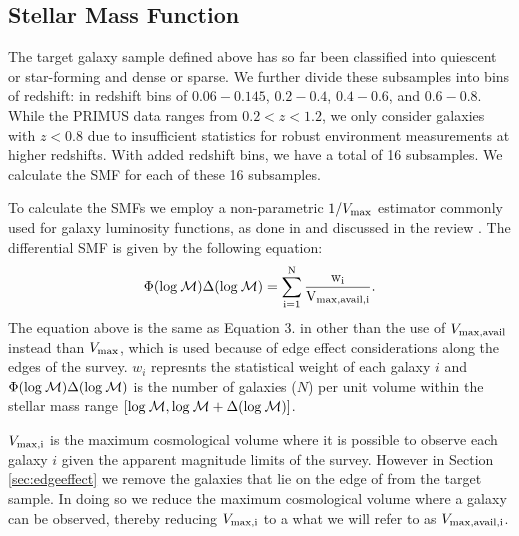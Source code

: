 \documentclass{emulateapj}
\begin{document}
\subsection{Stellar Mass Function} \label{sec:smf_const}
The target galaxy sample defined above has so far
been classified into quiescent or star-forming and 
dense or sparse. We further divide these subsamples 
into bins of redshift:  in redshift bins of $0.06-0.145$, 
$0.2-0.4$, $0.4-0.6$, and $0.6-0.8$. While the 
PRIMUS data ranges from $0.2 < z < 1.2$, we only 
consider galaxies with $ z<0.8$ due to insufficient
statistics for robust environment measurements at 
higher redshifts. With added redshift bins, we have a
total of 16 subsamples. We calculate the SMF for 
each of these 16 subsamples. 

To calculate the SMFs we employ a non-parametric $1/{V_{\rm{max}}}$ estimator commonly used for galaxy luminosity functions, as done in \cite{Moustakas:2013aa} and discussed 
in the review \cite{Johnston:2011aa}. 
The differential SMF is given by the following equation:
\begin{equation} \label{eq:phi}
\Phi(\rm{log}\: \mathcal{M}) \Delta(\rm{log} \:\mathcal{M}) = \sum\limits_{i=1}^{N} \frac{w_i}{V_{\rm{max,avail},i}}. 
\end{equation}
The equation above is the same as Equation 3. in \cite{Moustakas:2013aa} other than the use of $V_{\rm{max,avail}}$ instead than $V_{\rm{max}}$, which is used because of edge effect 
considerations along the edges of the survey. 
$w_i$ represnts the statistical weight of each galaxy $i$ and $\Phi(\rm{log}\: \mathcal{M}) \Delta(\rm{log}\: \mathcal{M})$ is the number of galaxies ($N$) per unit volume within the 
stellar mass range $[\rm{log} \:\mathcal{M}, \rm{log} \:\mathcal{M}+\Delta(\rm{log} \:\mathcal{M})]$.

$V_{\rm{max},i}$ is the maximum cosmological volume where it is possible to observe each galaxy $i$ given the apparent magnitude limits of the survey.
However in Section \ref{sec:edgeeffect} we remove the galaxies that lie on the edge of from the target sample. 
In doing so we reduce the maximum cosmological volume where a galaxy can be observed, thereby reducing $V_{\rm{max},i}$ to a what we will refer to as $V_{\rm{max,avail},i}$.
\end{document}

